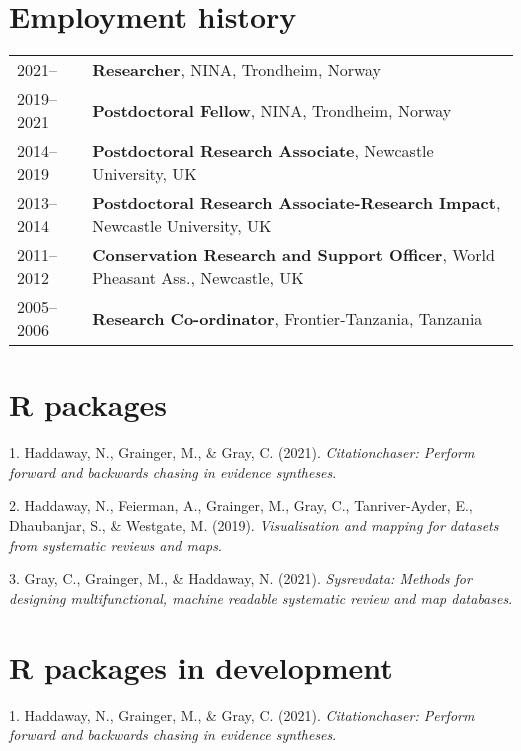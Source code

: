 \documentclass[11pt, a4paper]{awesome-cv}
\begin{document}
\hypertarget{employment-history}{%
\section{Employment history}\label{employment-history}}

\begin{tabular}{ll}
  2021-- & \textbf{ Researcher}, NINA, Trondheim, Norway \\ 
  2019--2021 & \textbf{ Postdoctoral Fellow}, NINA, Trondheim, Norway \\ 
  2014--2019 & \textbf{ Postdoctoral Research Associate}, Newcastle University, UK \\ 
  2013--2014 & \textbf{ Postdoctoral Research Associate-Research Impact}, Newcastle University, UK \\ 
  2011--2012 & \textbf{ Conservation Research and Support Officer}, World Pheasant Ass., Newcastle, UK \\ 
  2005--2006 & \textbf{ Research Co-ordinator}, Frontier-Tanzania, Tanzania \\ 
  \end{tabular}

\hypertarget{r-packages}{%
\section{R packages}\label{r-packages}}

\hypertarget{bibliography}{}
\leavevmode\hypertarget{ref-R-citationchaser}{}%
1. Haddaway, N., Grainger, M., \& Gray, C. (2021). \emph{Citationchaser:
Perform forward and backwards chasing in evidence syntheses}.

\leavevmode\hypertarget{ref-R-eviatlas}{}%
2. Haddaway, N., Feierman, A., Grainger, M., Gray, C., Tanriver-Ayder,
E., Dhaubanjar, S., \& Westgate, M. (2019). \emph{Visualisation and
mapping for datasets from systematic reviews and maps}.

\leavevmode\hypertarget{ref-R-sysrevdata}{}%
3. Gray, C., Grainger, M., \& Haddaway, N. (2021). \emph{Sysrevdata:
Methods for designing multifunctional, machine readable systematic
review and map databases}.

\hypertarget{r-packages-in-development}{%
\section{R packages in development}\label{r-packages-in-development}}

\hypertarget{bibliography}{}
\leavevmode\hypertarget{ref-R-citationchaser}{}%
1. Haddaway, N., Grainger, M., \& Gray, C. (2021). \emph{Citationchaser:
Perform forward and backwards chasing in evidence syntheses}.
\end{document}
